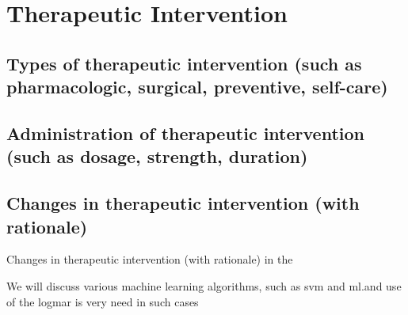 
\section{Therapeutic Intervention}
\subsection{Types of therapeutic intervention (such as pharmacologic, surgical, preventive, self-care)}

\subsection{Administration of therapeutic intervention (such as dosage, strength, duration)}

\subsection{Changes in therapeutic intervention (with rationale)}
\begin{frame}[allowframebreaks]{Changes in therapeutic intervention (with rationale)}
        in the \cite{wajuihian2021gender}

        We will discuss various machine learning algorithms, such as \gls{svm} and \acrshort{ml}.and use of the \acrshort{logmar} is very need in such cases

\end{frame}